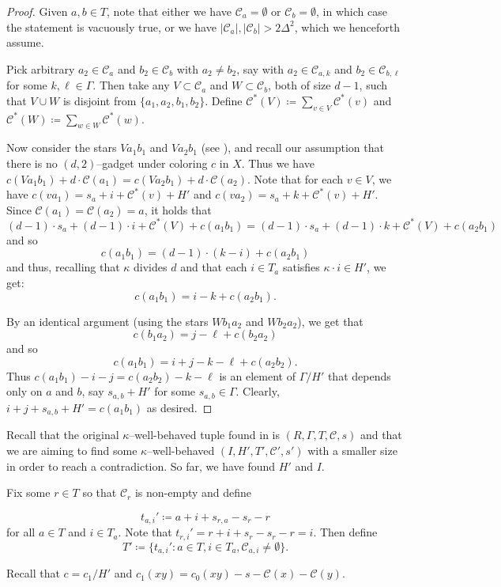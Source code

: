 \documentclass{article}
\newcommand{\beq}[1]{\begin{equation}\label{#1}}
\newcommand{\enq}[0]{\end{equation}}
\newcommand{\cC}{\mathcal{C} }
\theoremstyle{definition}
\begin{document}
\begin{proof}
Given $a, b\in T$, note that either we have $\cC_a=\emptyset$ or $\cC_b=\emptyset$, in which case the statement is vacuously true, or we have $|\cC_a|, |\cC_b|>2\Delta^2$, which we henceforth assume.

Pick arbitrary $a_2\in \cC_a$ and $b_2\in \cC_b$ with $a_2\neq b_2$, say with $a_2\in \cC_{a,k}$ and $b_2\in \cC_{b,\ell}$ for some $k, \ell\in\Gamma$. Then take any $V\subset \cC_a$ and $W\subset \cC_b$, both of size $d-1$, such that $V\cup W$ is disjoint from $\{a_1,a_2,b_1,b_2\}$. Define $\cC^*(V) \coloneqq  \sum_{v\in V} \cC^*(v)$ and $\cC^*(W) \coloneqq  \sum_{w\in W} \cC^*(w)$. 
  
Now consider the stars $Va_1b_1$ and $Va_2b_1$ (see ), and recall our assumption that there is no $(d, 2)$--gadget under coloring $c$ in $X$. Thus we have $c(Va_1b_1)+d\cdot \cC(a_1)=c(Va_2b_1)+d\cdot \cC(a_2)$. Note that for each $v\in V$, we have $c(va_1)=s_a+i+\cC^*(v)+H'$ and $c(va_2)=s_a+k+\cC^*(v)+H'$. Since $\cC(a_1)=\cC(a_2)=a$, it holds that  
$$(d-1)\cdot s_a+(d-1)\cdot i+\cC^*(V)+c(a_1b_1)=(d-1)\cdot s_a+(d-1)\cdot k+\cC^*(V)+c(a_2b_1)$$
and so $$c(a_1b_1)=(d-1)\cdot (k-i)+c(a_2b_1)$$ and thus, recalling that $\kappa$ divides $d$ and that each $i\in T_a$ satisfies $\kappa\cdot i \in H'$, we get: $$c(a_1b_1)=i-k+c(a_2b_1).$$

By an identical argument (using the stars $Wb_1a_2$ and $Wb_2a_2$), we get that $$c(b_1a_2) = j-\ell+c(b_2a_2)$$ and so $$c(a_1b_1)=i+j-k-\ell+c(a_2b_2).$$ Thus $c(a_1b_1)-i-j=c(a_2b_2)-k-\ell$ is an element of $\Gamma/H'$ that depends only on $a$ and $b$, say $s_{a,b}+H'$ for some $s_{a, b}\in\Gamma$. Clearly, $i+j+s_{a,b}+H'=c(a_1b_1)$ as desired.
\end{proof}

Recall that the original $\kappa$--well-behaved tuple found in  is $(R,\Gamma,T,\cC,s)$ and that we are aiming to find some $\kappa$--well-behaved $(I,H',T',\cC',s')$ with a smaller size in order to reach a contradiction. So far, we have found $H'$ and $I$.

Fix some $r\in T$ so that $\cC_r$ is non-empty and define

\[t_{a,i}'\coloneqq a + i + s_{r,a} - s_r - r\]
for all $a\in T$ and $i \in T_a$. Note that $t_{r,i}' = r + i + s_r-s_r-r=i$. Then define
\beq{T'def}T' \coloneqq \{t_{a,i}': a\in T, i\in T_a, \cC_{a, i}\neq\emptyset\}.\enq

Recall that $c=c_1/H'$ and $c_1(xy)=c_0(xy)-s-\cC(x)-\cC(y)$.
\end{document}
